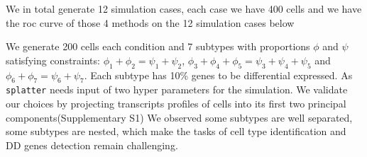 \documentclass[aoas,preprint]{imsart}
\begin{document}
We in total generate 12 simulation cases, each case we have 400 cells and we have the roc curve of those 4 methods on the 12 simulation cases below
 
We generate 200 cells each condition 
and 7 subtypes with proportions $\phi$ and $\psi$ satisfying constraints: $\phi_1 + \phi_2 = \psi_1 + \psi_2$, $\phi_3 + \phi_4 +\phi_5 = \psi_3 + \psi_4 + \psi_5$ and $\phi_6 + \phi_7 = \psi_6 + \psi_7$. 
Each subtype has 10\% genes to be differential expressed. 
As \verb+splatter+ needs input of two hyper parameters for the simulation. We validate our choices by projecting transcripts profiles of cells into its first two principal components(Supplementary S1)
We observed some subtypes are well separated, some subtypes are nested, which make the tasks of cell type identification and DD genes detection remain challenging. 




\end{document}
